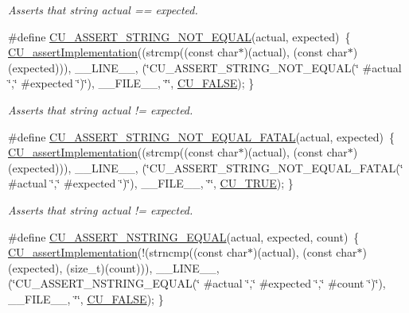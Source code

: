 \begin{DoxyCompactItemize}
\begin{DoxyCompactList}\small\item\em Asserts that string actual == expected. \end{DoxyCompactList}\item 
\#define \hyperlink{group___framework_ga423898d76eb348c950d21bb488f219f3}{C\+U\+\_\+\+A\+S\+S\+E\+R\+T\+\_\+\+S\+T\+R\+I\+N\+G\+\_\+\+N\+O\+T\+\_\+\+E\+Q\+U\+A\+L}(actual, expected)~\{ \hyperlink{group___framework_gad409fc536d9d3fb5f659c76421e8ce3b}{C\+U\+\_\+assert\+Implementation}((strcmp((const char$\ast$)(actual), (const char$\ast$)(expected))), \+\_\+\+\_\+\+L\+I\+N\+E\+\_\+\+\_\+, (\char`\"{}C\+U\+\_\+\+A\+S\+S\+E\+R\+T\+\_\+\+S\+T\+R\+I\+N\+G\+\_\+\+N\+O\+T\+\_\+\+E\+Q\+U\+A\+L(\char`\"{} \#actual \char`\"{},\char`\"{}  \#expected \char`\"{})\char`\"{}), \+\_\+\+\_\+\+F\+I\+L\+E\+\_\+\+\_\+, \char`\"{}\char`\"{}, \hyperlink{group___framework_ga7453214541b156ef868681eaafe60860}{C\+U\+\_\+\+F\+A\+L\+S\+E}); \}
\begin{DoxyCompactList}\small\item\em Asserts that string actual != expected. \end{DoxyCompactList}\item 
\#define \hyperlink{group___framework_ga5a50e544bf693dbe91d26dd605753f30}{C\+U\+\_\+\+A\+S\+S\+E\+R\+T\+\_\+\+S\+T\+R\+I\+N\+G\+\_\+\+N\+O\+T\+\_\+\+E\+Q\+U\+A\+L\+\_\+\+F\+A\+T\+A\+L}(actual, expected)~\{ \hyperlink{group___framework_gad409fc536d9d3fb5f659c76421e8ce3b}{C\+U\+\_\+assert\+Implementation}((strcmp((const char$\ast$)(actual), (const char$\ast$)(expected))), \+\_\+\+\_\+\+L\+I\+N\+E\+\_\+\+\_\+, (\char`\"{}C\+U\+\_\+\+A\+S\+S\+E\+R\+T\+\_\+\+S\+T\+R\+I\+N\+G\+\_\+\+N\+O\+T\+\_\+\+E\+Q\+U\+A\+L\+\_\+\+F\+A\+T\+A\+L(\char`\"{} \#actual \char`\"{},\char`\"{}  \#expected \char`\"{})\char`\"{}), \+\_\+\+\_\+\+F\+I\+L\+E\+\_\+\+\_\+, \char`\"{}\char`\"{}, \hyperlink{group___framework_ga99641394bc766ca9c4a295e942fed1ef}{C\+U\+\_\+\+T\+R\+U\+E}); \}
\begin{DoxyCompactList}\small\item\em Asserts that string actual != expected. \end{DoxyCompactList}\item 
\#define \hyperlink{group___framework_ga04f63f895c1b37058af366ac334e584d}{C\+U\+\_\+\+A\+S\+S\+E\+R\+T\+\_\+\+N\+S\+T\+R\+I\+N\+G\+\_\+\+E\+Q\+U\+A\+L}(actual, expected, count)~\{ \hyperlink{group___framework_gad409fc536d9d3fb5f659c76421e8ce3b}{C\+U\+\_\+assert\+Implementation}(!(strncmp((const char$\ast$)(actual), (const char$\ast$)(expected), (size\+\_\+t)(count))), \+\_\+\+\_\+\+L\+I\+N\+E\+\_\+\+\_\+, (\char`\"{}C\+U\+\_\+\+A\+S\+S\+E\+R\+T\+\_\+\+N\+S\+T\+R\+I\+N\+G\+\_\+\+E\+Q\+U\+A\+L(\char`\"{} \#actual \char`\"{},\char`\"{}  \#expected \char`\"{},\char`\"{} \#count \char`\"{})\char`\"{}), \+\_\+\+\_\+\+F\+I\+L\+E\+\_\+\+\_\+, \char`\"{}\char`\"{}, \hyperlink{group___framework_ga7453214541b156ef868681eaafe60860}{C\+U\+\_\+\+F\+A\+L\+S\+E}); \}

\end{DoxyCompactItemize}
